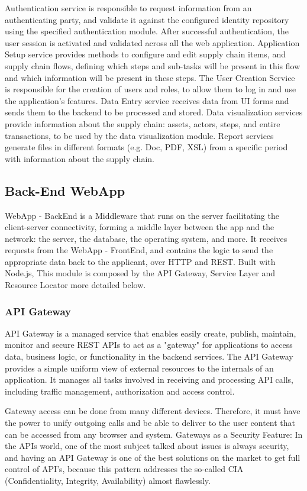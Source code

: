 Authentication service is responsible to request information from an authenticating party, and validate it against the configured identity repository using the specified authentication module. After successful authentication, the user session is activated and validated across all the web application. Application Setup service provides methods to configure and edit supply chain items, and supply chain flows, defining which steps and sub-tasks will be present in this flow and which information will be present in these steps. The User Creation Service is responsible for the creation of users and roles, to allow them to log in and use the application’s features. Data Entry service receives data from UI forms and sends them to the backend to be processed and stored. Data visualization services provide information about the supply chain: assets, actors, steps, and entire transactions, to be used by the data visualization module. Report services generate files in different formats (e.g. Doc, PDF, XSL) from a specific period with information about the supply chain.

\subsection{Back-End WebApp}\label{sec:WebAppBackEnd}
WebApp - BackEnd is a Middleware that runs on the server facilitating the client-server connectivity, forming a middle layer between the app and the network: the server, the database, the operating system, and more. It receives requests from the WebApp - FrontEnd, and contains the logic to send the appropriate data back to the applicant, over HTTP and REST. Built with Node.js, This module  is composed by the API Gateway, Service Layer and Resource Locator more detailed below.

\subsubsection{API Gateway}\label{sec:APIGateway}
API Gateway is a managed service that enables easily create, publish, maintain, monitor and secure REST APIs to act as a "gateway" for applications to access data, business logic, or functionality in the backend services. The API Gateway provides a simple uniform view of external resources to the internals of an application. It manages all tasks involved in receiving and processing API calls, including traffic management, authorization and access control.

Gateway access can be done from many different devices. Therefore, it must have the power to unify outgoing calls and be able to deliver to the user content that can be accessed from any browser and system. Gateways as a Security Feature: In the APIs world, one of the most subject talked about issues is always security, and having an API Gateway is one of the best solutions on the market to get full control of API’s, because this pattern addresses the so-called CIA (Confidentiality, Integrity, Availability) almost flawlessly.

